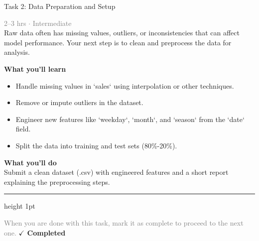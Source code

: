 \documentclass[10pt,a4paper]{article}
\begin{document}
\begin{taskbox}{Task 2: Data Preparation and Setup}

    {\small \textcolor{gray}{2--3 hrs $\cdot$ Intermediate}}\\[12pt]

      
Raw data often has missing values, outliers, or inconsistencies that can affect model performance. Your next step is to clean and preprocess the data for analysis.  


\vspace{8pt}
{\large \textbf{\textcolor{brandLight}{What you'll learn}}}\\[4pt]  
\begin{itemize}
    \item Handle missing values in `sales` using interpolation or other techniques.  
    \item Remove or impute outliers in the dataset.  
    \item Engineer new features like `weekday`, `month`, and `season` from the `date` field.  
    \item Split the data into training and test sets (80\%-20\%).  
\end{itemize}

\vspace{8pt}
{\large \textbf{\textcolor{brandLight}{What you'll do}}}\\[4pt]  
Submit a clean dataset (.csv) with engineered features and a short report explaining the preprocessing steps.\par

    \vspace{16pt}

    \textcolor{cardBorder}{\hrule height 1pt}\vspace{8pt}

    \small \textcolor{gray}{When you are done with this task, mark it as complete to proceed to the next one.} \hfill \textbf{\textcolor{brandDark}{$\checkmark$ Completed}}

\end{taskbox}
\end{document}
